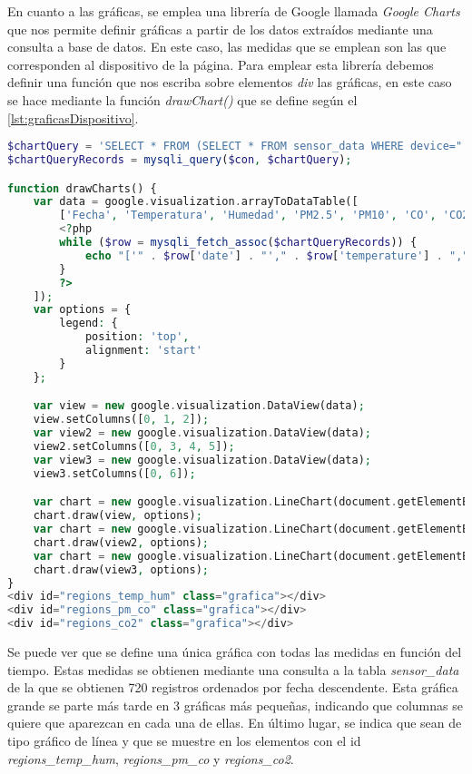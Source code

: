 En cuanto a las gráficas, se emplea una librería de Google llamada \textit{Google Charts} que nos permite definir gráficas a partir de los datos extraídos mediante una consulta a base de datos. En este caso, las medidas que se emplean son las que corresponden al dispositivo de la página. Para emplear esta librería debemos definir una función que nos escriba sobre elementos \textit{div} las gráficas, en este caso se hace mediante la función \textit{drawChart()} que se define según el \autoref{lst:graficasDispositivo}.
\begin{lstlisting}[language=PHP, caption=Gráficas de las medidas del dispositivo, label=lst:graficasDispositivo]
$chartQuery = 'SELECT * FROM (SELECT * FROM sensor_data WHERE device="' . $_GET["id"] . '" ORDER BY date DESC LIMIT 720) sub ORDER BY date ASC';
$chartQueryRecords = mysqli_query($con, $chartQuery);

function drawCharts() {
    var data = google.visualization.arrayToDataTable([
        ['Fecha', 'Temperatura', 'Humedad', 'PM2.5', 'PM10', 'CO', 'CO2'],
        <?php
        while ($row = mysqli_fetch_assoc($chartQueryRecords)) {
            echo "['" . $row['date'] . "'," . $row['temperature'] . "," . $row['humidity'] . "," . $row['pm2_5'] . "," . $row['pm10'] . "," . $row['co'] . "," . $row['co2'] . "],";
        }
        ?>
    ]);
    var options = {
        legend: {
            position: 'top',
            alignment: 'start'
        }
    };

    var view = new google.visualization.DataView(data);
    view.setColumns([0, 1, 2]);
    var view2 = new google.visualization.DataView(data);
    view2.setColumns([0, 3, 4, 5]);
    var view3 = new google.visualization.DataView(data);
    view3.setColumns([0, 6]);

    var chart = new google.visualization.LineChart(document.getElementById('regions_temp_hum'));
    chart.draw(view, options);
    var chart = new google.visualization.LineChart(document.getElementById('regions_pm_co'));
    chart.draw(view2, options);
    var chart = new google.visualization.LineChart(document.getElementById('regions_co2'));
    chart.draw(view3, options);
}
<div id="regions_temp_hum" class="grafica"></div>
<div id="regions_pm_co" class="grafica"></div>
<div id="regions_co2" class="grafica"></div>
\end{lstlisting}

Se puede ver que se define una única gráfica con todas las medidas en función del tiempo. Estas medidas se obtienen mediante una consulta a la tabla \textit{sensor\_data} de la que se obtienen 720 registros ordenados por fecha descendente. Esta gráfica grande se parte más tarde en 3 gráficas más pequeñas, indicando que columnas se quiere que aparezcan en cada una de ellas. En último lugar, se indica que sean de tipo gráfico de línea y que se muestre en los elementos con el id \textit{regions\_temp\_hum}, \textit{regions\_pm\_co} y \textit{regions\_co2}.

